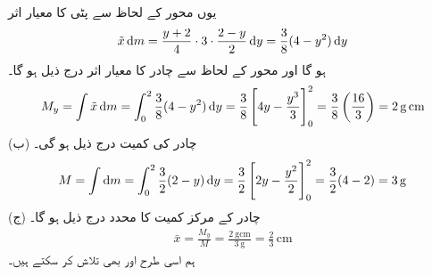 یوں محور  کے لحاظ سے پٹی کا معیار اثر
\begin{align*}
\tilde{x}\dif m=\frac{y+2}{4}\cdot 3\cdot \frac{2-y}{2}\dif y=\frac{3}{8}(4-y^2)\dif y
\end{align*}
ہو گا اور محور  کے لحاظ سے چادر کا معیار اثر درج ذیل ہو گا۔
\begin{align*}
M_y=\int\tilde{x}\dif m=\int_0^2\frac{3}{8}(4-y^2)\dif y=\frac{3}{8}\left[4y-\frac{y^3}{3}\right]_0^2=\frac{3}{8}\left(\frac{16}{3}\right)=\SI{2}{\gram\centi\meter}
\end{align*}
(ب) چادر کی کمیت درج ذیل ہو گی۔
\begin{align*}
M=\int\dif m=\int_0^2\frac{3}{2}(2-y)\dif y=\frac{3}{2}\left[2y-\frac{y^2}{2}\right]_0^2=\frac{3}{2}(4-2)=\SI{3}{\gram}
\end{align*}
(ج) چادر کے مرکز کمیت کا  محدد درج ذیل ہو گا۔
\begin{align*}
\bar{x}=\frac{M_y}{M}=\frac{\SI{2}{\gram\centi\meter}}{\SI{3}{\gram}}=\frac{2}{3}\,\si{\centi\meter}
\end{align*}
ہم اسی طرح  اور  بھی تلاش کر سکتے ہیں۔

